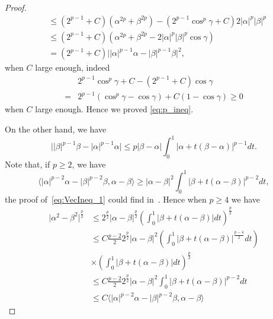 \documentclass[11pt]{amsart}
\theoremstyle{definition}
\numberwithin{equation}{section}
\newcommand*\abs[1]{\lvert#1\rvert}
\begin{document}
\begin{proof}
\begin{equation}
\begin{split}
			&\leq \left(2^{p-1}+C\right)\left(\alpha^{2p} + \beta^{2p}\right)
			- \left(2^{p-1}\cos^p{\gamma}+C\right)2\abs{\alpha}^p\abs{\beta}^p\\
			&\leq \left(2^{p-1}+C\right)\left(\alpha^{2p} + \beta^{2p} - 2\abs{\alpha}^p\abs{\beta}^p\cos{\gamma}\right)\\
			&= \left(2^{p-1}+C\right)\abs{\abs{\alpha}^{p-1}\alpha - \abs{\beta}^{p-1}\beta}^2,
		\end{split}
	\end{equation}
	when $C$ large enough, indeed
	\begin{equation}
		\begin{split}
			& 2^{p-1}\cos^p{\gamma} + C - \left(2^{p-1}+C\right)\cos{\gamma}\\
			={} & 2^{p-1}\left(\cos^p{\gamma} - \cos{\gamma}\right) + C\left(1-\cos{\gamma}\right)
			\geq 0
		\end{split}
	\end{equation}
	when $C$ large enough. Hence we proved \cref{eq:p_ineq}.

	On the other hand, we have
	\begin{equation}
		\abs{\abs{\beta}^{p-1}\beta - \abs{\alpha}^{p-1}\alpha} \leq p\abs{\beta-\alpha}\int_0^1 \abs{\alpha + t(\beta - \alpha)}^{p-1}dt.
	\end{equation}
	Note that, if $p \geq 2$, we have
	\begin{equation}\label{eq:VecIneq_1}
		\langle \abs{\alpha}^{p-2}\alpha - \abs{\beta}^{p-2}\beta, \alpha-\beta\rangle
		\geq \abs{\alpha-\beta}^2\int_0^1 \abs{\beta + t(\alpha - \beta)}^{p-2}dt,
	\end{equation}
	the proof of~\cref{eq:VecIneq_1} could find in~\cite{lindqvistNotesStationaryPLaplace2019}.
	Hence when $p \geq 4$ we have
	\begin{equation}
		\begin{split}
			\abs{\alpha^2 - \beta^2}^{\frac{p}{2}}
			&\leq 2^{\frac{p}{2}}\abs{\alpha-\beta}^{\frac{p}{2}}
			\left(\int_0^1 \abs{\beta + t(\alpha - \beta)}dt\right)^{\frac{p}{2}}\\
			&\leq C\frac{p-2}{2}2^{\frac{p}{2}}\abs{\alpha-\beta}^2
			\left(\int_0^1 \abs{\beta + t(\alpha - \beta)}^{\frac{p-4}{2}}dt\right)\\
			&\times\left(\int_0^1 \abs{\beta + t(\alpha - \beta)}dt\right)^{\frac{p}{2}}\\
			&\leq C\frac{p-2}{2}2^{\frac{p}{2}}\abs{\alpha-\beta}^2
			\int_0^1 \abs{\beta + t(\alpha - \beta)}^{p-2}dt\\
			&\leq C \langle \abs{\alpha}^{p-2}\alpha - \abs{\beta}^{p-2}\beta, \alpha-\beta\rangle
		\end{split}
	\end{equation}
\end{proof}
\end{document}
